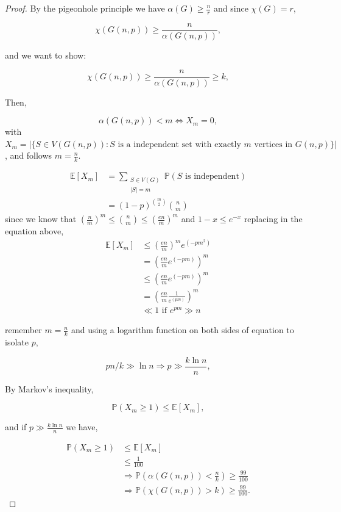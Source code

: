 \documentclass[12pt,twoside,a4paper]{book}
\numberwithin{equation}{section}
\let\log=\ln
\theoremstyle{remark}
\begin{document}
\begin{proof}
By the pigeonhole principle we have $\alpha (G) \geq \frac{n}{r}$ and since $\chi(G)=r$,

$$\chi(G(n,p)) \geq \frac{n}{\alpha(G(n,p))},$$

and we want to show:

$$\chi(G(n,p)) \geq \frac{n}{\alpha(G(n,p))} \geq k ,$$

Then,

$$\alpha(G(n,p)) < m \iff X_m=0 ,$$
with 
$X_m = \big|\{S\in V(G(n,p))\colon \text{$S$ is a independent set with exactly $m$ vertices in $G(n,p)$}\}\big|$,
and follows $m = \frac{n}{k}$. 

\begin{align*}
\mathbb{E}[X_m]&=\sum_{\substack{S \in V(G) \\ |S| = m}} \mathbb{P}(S\text{ is independent})\\
&=(1-p)^{\binom{m}{2}} \binom{n}{m}
\end{align*}
since we know that $\left(\frac{n}{m}\right)^m \leq \binom{n}{m} \leq \left(\frac{en}{m}\right)^m$ and $1-x \leq e^{-x}$ replacing in the equation above,
\begin{align*}
\mathbb{E}[X_m] &\leq \left(\frac{en}{m}\right)^m  e^{(-pm^2)} \\
&= \left(\frac{en}{m} e^{(-pm)}\right)^m\\
&\leq \left(\frac{en}{m} e^{(-pm)}\right)^m \\
&= \left(\frac{en}{m}\frac{1}{e^{(pm)}}\right)^m  \\
&\ll 1 \text{ if } e^{pm} \gg n
\end{align*}

remember $m =\frac{n}{k}$ and using a logarithm function on both sides of equation to isolate $p$,

$$ pn/k \gg \log n \Rightarrow p \gg \frac{k\log n}{n},$$
 
 By Markov's inequality,
 
 $$ \mathbb{P}(X_m \geq 1) \leq \mathbb{E}[X_m] ,$$
 
and if $p \gg \frac{k \log n}{n}$ we have,
 
 \begin{align*}
\mathbb{P}(X_m \geq 1) &\leq \mathbb{E}[X_m] \\
&\leq \frac{1}{100}  \\
&\Rightarrow \mathbb{P}(\alpha (G(n,p)) < \frac{n}{k}) \geq \frac{99}{100}\\ 
&\Rightarrow  \mathbb{P}(\chi(G(n,p)) > k) \geq \frac{99}{100}.
\end{align*}


\end{proof}
\end{document}
